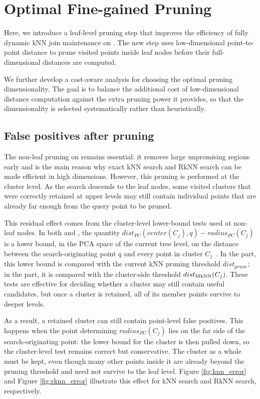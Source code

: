 \section{Optimal Fine-gained Pruning}\label{sec:pruning}



Here, we introduce a leaf-level pruning step that improves the efficiency of fully dynamic kNN join maintenance on \dualtree. The new step uses low-dimensional point-to-point distance to prune visited points inside leaf nodes before their full-dimensional distances are computed.

We further develop a cost-aware analysis for choosing the optimal pruning dimensionality. The goal is to balance the additional cost of low-dimensional distance computation against the extra pruning power it provides, so that the dimensionality is selected systematically rather than heuristically.

\subsection{False positives after pruning}
The non-leaf pruning on \dualtree remains essential: it removes large unpromising regions early and is the main reason why exact kNN search and RkNN search can be made efficient in high dimensions. However, this pruning is performed at the cluster level. As the search descends to the leaf nodes, some visited clusters that were correctly retained at upper levels may still contain individual points that are already far enough from the query point to be pruned.

This residual effect comes from the cluster-level lower-bound tests used at non-leaf nodes. In both \deltatree and \hdrtree, the quantity $dist_{PC}(center(C_j), q)-radius_{PC}(C_j)$ is a lower bound, in the PCA space of the current tree level, on the distance between the search-originating point $q$ and every point in cluster $C_j$~\cite{cui2003contorting,yang2014continuous}. In the \deltatree part, this lower bound is compared with the current kNN pruning threshold $dist_{prune}$; in the \hdrtree part, it is compared with the cluster-side threshold $dist_{\operatorname{MkNN}}(C_j)$. These tests are effective for deciding whether a cluster may still contain useful candidates, but once a cluster is retained, all of its member points survive to deeper levels.

As a result, a retained cluster can still contain point-level false positives. This happens when the point determining $radius_{PC}(C_j)$ lies on the far side of the search-originating point: the lower bound for the cluster is then pulled down, so the cluster-level test remains correct but conservative. The cluster as a whole must be kept, even though many other points inside it are already beyond the pruning threshold and need not survive to the leaf level. Figure \ref{fig:knn_error} and Figure \ref{fig:rknn_error} illustrate this effect for kNN search and RkNN search, respectively.


